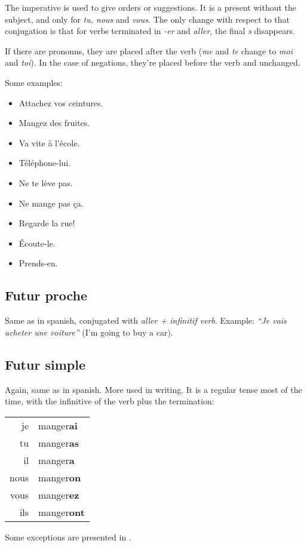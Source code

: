\documentclass[palatino]{nicenotes}
\newcommand{\conjug}[6]{\begin{tabular}{rl}
je & #1 \\
tu & #2 \\
il & #3 \\
nous & #4 \\
vous & #5 \\
ils & #6 \\
\end{tabular}}
\begin{document}
The imperative is used to give orders or suggestions. It is a present without the subject, and only for \textit{tu, nous} and \textit{vous}. The only change with respect to that conjugation is that for verbs terminated in \textit{-er} and \textit{aller}, the final \textit{s} disappears.

If there are pronouns, they are placed after the verb (\textit{me} and \textit{te} change to \textit{moi} and \textit{toi}). In the case of negations, they're placed before the verb and unchanged.

Some examples:

\begin{multicols}{3}
\begin{itemize}
\item Attachez vos ceintures.
\item Mangez des fruites.
\item Va vite à l'école.
\item Téléphone-lui.
\item Ne te lève pas.
\item Ne mange pas ça.
\item Regarde la rue!
\item Écoute-le.
\item Prends-en.
\end{itemize}
\end{multicols}

\subsection{Futur proche}

Same as in spanish, conjugated with \textit{aller + infinitif verb}. Example: \textit{``Je vais acheter une voiture''} (I'm going to buy a car).

\subsection{Futur simple}

Again, same as in spanish. More used in writing. It is a regular tense most of the time, with the infinitive of the verb plus the termination:

\begin{center}
\conjug
	{manger\textbf{ai}}
	{manger\textbf{as}}
	{manger\textbf{a}}
	{manger\textbf{on}}
	{manger\textbf{ez}}
	{manger\textbf{ont}}
\end{center}

Some exceptions are presented in .
\end{document}
